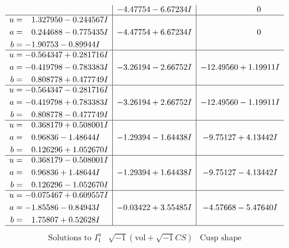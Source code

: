 \documentclass[1p]{elsarticle_modified}
\theoremstyle{definition}
\newcommand{\I}{\sqrt{-1}}
\begin{document}
$$\begin{array}{c|c|c}
 & -4.47754 - 6.67234 I & \phantom{-0.000000 } 0 \\ \hline\begin{aligned}
u &= \phantom{-}1.327950 - 0.244567 I \\
a &= \phantom{-}0.244688 - 0.775435 I \\
b &= -1.90753 - 0.89944 I\end{aligned}
 & -4.47754 + 6.67234 I & \phantom{-0.000000 } 0 \\ \hline\begin{aligned}
u &= -0.564347 + 0.281716 I \\
a &= -0.419798 - 0.783383 I \\
b &= \phantom{-}0.808778 + 0.477749 I\end{aligned}
 & -3.26194 - 2.66752 I & -12.49560 + 1.19911 I \\ \hline\begin{aligned}
u &= -0.564347 - 0.281716 I \\
a &= -0.419798 + 0.783383 I \\
b &= \phantom{-}0.808778 - 0.477749 I\end{aligned}
 & -3.26194 + 2.66752 I & -12.49560 - 1.19911 I \\ \hline\begin{aligned}
u &= \phantom{-}0.368179 + 0.508001 I \\
a &= \phantom{-}0.96836 - 1.48644 I \\
b &= \phantom{-}0.126296 + 1.052670 I\end{aligned}
 & -1.29394 - 1.64438 I & -9.75127 + 4.13442 I \\ \hline\begin{aligned}
u &= \phantom{-}0.368179 - 0.508001 I \\
a &= \phantom{-}0.96836 + 1.48644 I \\
b &= \phantom{-}0.126296 - 1.052670 I\end{aligned}
 & -1.29394 + 1.64438 I & -9.75127 - 4.13442 I \\ \hline\begin{aligned}
u &= -0.075467 + 0.609557 I \\
a &= -1.85586 - 0.84943 I \\
b &= \phantom{-}1.75807 + 0.52628 I\end{aligned}
 & -0.03422 + 3.55485 I & -4.57668 - 5.47640 I\\
 \hline 
 \end{array}$$\newpage$$\begin{array}{c|c|c}  
\text{Solutions to }I^u_{1}& \I (\text{vol} + \sqrt{-1}CS) & \text{Cusp shape}\\

\end{array}$$
\end{document}
